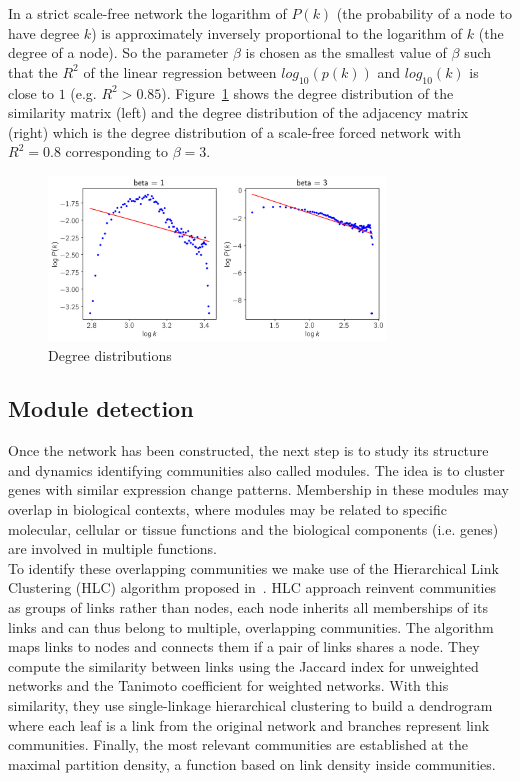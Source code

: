 \documentclass[journal, onecolumn]{IEEEtran}
\begin{document}
In a strict scale-free network the logarithm of $P(k)$ (the probability of a node to have degree $k$) is approximately inversely proportional to the logarithm of $k$ (the degree of a node). So the parameter $\beta$ is chosen as the smallest value of $\beta$ such that the $R^2$ of the linear regression between $log_{10}(p(k))$ and $log_{10}(k)$ is close to $1$ (e.g. $R^2 > 0.85$). Figure~\ref{fig:beta} shows the degree distribution of the similarity matrix (left) and the degree distribution of the adjacency matrix (right) which is the degree distribution of a scale-free forced network with $R^2 = 0.8$ corresponding to $\beta = 3$.

\begin{figure}[h]
  \centering
    \includegraphics[clip,width=0.8\textwidth]{Figures/pick_beta.png}
  \caption{Degree distributions}
  \label{fig:beta}
\end{figure}

\subsection{Module detection}	
Once the network has been constructed, the next step is to study its structure and dynamics identifying communities also called modules. The idea is to cluster genes with similar expression change patterns. Membership in these modules may overlap in biological contexts, where modules may be related to specific molecular, cellular or tissue functions and the biological components (i.e. genes) are involved in multiple functions.\\

To identify these overlapping communities we make use of the Hierarchical Link Clustering (HLC) algorithm proposed in~\cite{ahn2010link}. HLC approach reinvent communities as groups of links rather than nodes, each node inherits all memberships of its links and can thus belong to multiple, overlapping communities. The algorithm maps links to nodes and connects them if a pair of links shares a node. They compute the similarity between links using the Jaccard index for unweighted networks and the Tanimoto coefficient for weighted networks. With this similarity, they use single-linkage hierarchical clustering to build a dendrogram where each leaf is a link from the original network and branches represent link communities. Finally, the most relevant communities are established at the maximal partition density, a function  based on link density inside communities.\\
\end{document}
